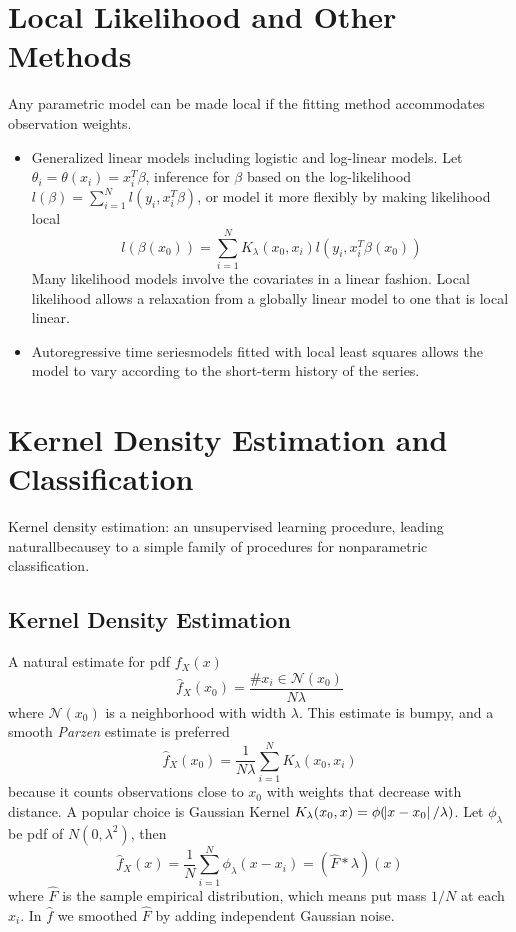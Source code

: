 \section{Local Likelihood and Other Methods}
Any parametric model can be made local if the fitting method accommodates observation weights. 
\begin{itemize}
\item Generalized linear models including logistic and log-linear models. Let $\theta_i=
\theta(x_i)=x_i^T\beta$, inference for $\beta$ based on the log-likelihood 
$l(\beta)=\sum_{i=1}^Nl(y_i,x_i^T\beta)$, or model it more flexibly by making likelihood local
\begin{equation*}
l(\beta(x_0))=\sum_{i=1}^NK_{\lambda}(x_0,x_i)l(y_i,x_i^T\beta(x_0))
\end{equation*}
Many likelihood models involve the covariates in a linear fashion. Local likelihood allows a 
relaxation from a globally linear model to one that is local linear. 
\item Autoregressive time seriesmodels fitted with local least squares allows the model to 
vary according to the short-term history of the series. 
\end{itemize} 

\section{Kernel Density Estimation and Classification}
Kernel density estimation: an unsupervised learning procedure, leading naturallbecausey to a simple 
family of procedures for nonparametric classification. 

\subsection{Kernel Density Estimation}
A natural estimate for pdf $f_X(x)$
\begin{equation*}
\hat{f}_X(x_0)=\frac{\#x_i\in\mathcal{N}(x_0)}{N\lambda}
\end{equation*}
where $\mathcal{N}(x_0)$ is a neighborhood with width $\lambda$. This estimate is bumpy, and 
a smooth \textit{Parzen} estimate is preferred
\begin{equation*}
\hat{f}_X(x_0)=\frac{1}{N\lambda}\sum_{i=1}^NK_{\lambda}(x_0,x_i)
\end{equation*}
because it counts observations close to $x_0$ with weights that decrease with distance. 
A popular choice is Gaussian Kernel $K_{\lambda}(x_0,x)=\phi(\abs{x-x_0}/\lambda)$. 
Let $\phi_{\lambda}$ be pdf of $N(0,\lambda^2)$, then 
\begin{equation*}
\hat{f}_X(x)=\frac{1}{N}\sum_{i=1}^N\phi_{\lambda}(x-x_i)=(\hat{F}*\lambda)(x)
\end{equation*}
where $\hat{F}$ is the sample empirical distribution, which means put mass $1/N$ at each $x_i$.
In $\hat{f}$ we smoothed $\hat{F}$ by adding independent Gaussian noise.   

